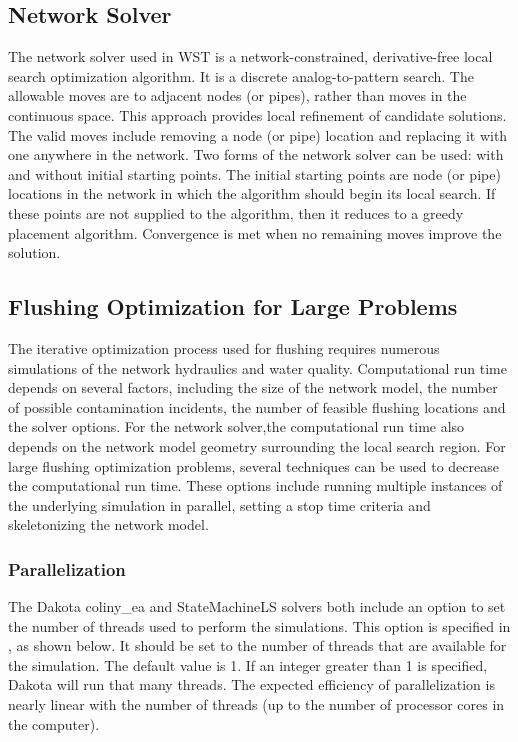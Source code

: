 \subsection{Network Solver}\label{coliny_statemachine}

The network solver used in WST is a network-constrained, derivative-free local search optimization algorithm. 
It is a discrete analog-to-pattern search. The allowable moves are to adjacent nodes (or pipes), rather than moves in the 
continuous space. This approach provides local refinement of candidate solutions. The valid moves include
removing a node (or pipe) location and replacing it with one anywhere in the network. Two forms of the network solver can be 
used: with and without initial starting points. The initial starting points are node (or pipe) locations in the network
in which the algorithm should begin its local search. If these points are not supplied to the algorithm, 
then it reduces to a greedy placement algorithm. Convergence is met when no remaining moves improve the solution.

\subsection{Flushing Optimization for Large Problems}

The iterative optimization process used for flushing requires numerous 
simulations of the network hydraulics and water quality. Computational run time depends on several factors, including 
the size of the network model, 
the number of possible contamination incidents, 
the number of feasible flushing locations 
and the solver options. For the network solver,the computational run time also depends on the network model
geometry surrounding the local search region. For large flushing optimization problems, several techniques can be used to 
decrease the computational run time. These options include running multiple instances of the underlying 
simulation in parallel, setting a stop time criteria and skeletonizing the network model.  

\subsubsection{Parallelization}

The Dakota coliny\_ea and StateMachineLS solvers both include an option to set 
the number of threads used to perform the simulations.   
This option is specified in \code{[solver][threads]}, as shown below. It should be 
set to the number of threads that are available for the simulation. The default value is 1.  
If an integer greater than 1 is specified, Dakota will run that many threads.
The expected efficiency of parallelization is nearly linear with the number of 
threads (up to the number of processor cores in the computer).

